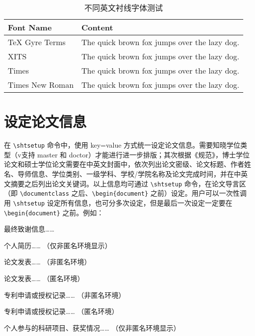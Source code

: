 \documentclass[
  fontset = mac,
]{shtthesis}
\providecommand{\timesnewroman}{\rmfamily}
\providecommand{\timesfamily}{\rmfamily}
\providecommand{\xitsfamily}{\rmfamily}
\begin{document}
\begin{table}[htb]
  \centering
  \caption{不同英文衬线字体测试}
  \label{tab::serif_fonts}
  \begin{tabular}{ll}
    \toprule
    Font Name & Content \\
    \midrule
    TeX Gyre Terms & {\rmfamily The quick brown fox jumps over the lazy dog.} \\
    XITS & {\xitsfamily The quick brown fox jumps over the lazy dog.} \\
    Times & {\timesfamily The quick brown fox jumps over the lazy dog.} \\
    Times New Roman & {\timesnewroman The quick brown fox jumps over the lazy dog.} \\
    \bottomrule
  \end{tabular}
\end{table}

\section{设定论文信息}
\shtthesis 在 \verb|\shtsetup| 命令中，使用 key=value 方式统一设定论文信息。\shtthesis 需要知晓学位类型（v\version 支持 master 和 doctor）才能进行进一步排版；其次根据《规范》，博士学位论文和硕士学位论文需要在中英文封面中，依次列出论文密级、论文标题、作者姓名、导师信息、学位类别、一级学科、学校/学院名称及论文完成时间，并在中英文摘要之后列出论文关键词。以上信息均可通过 \verb|\shtsetup| 命令，在论文导言区（即 \verb|\documentclass| 之后、\verb|\begin{document}| 之前）设定。用户可以一次性调用 \verb|\shtsetup| 设定所有信息，也可分多次设定，但是最后一次设定一定要在 \verb|\begin{document}| 之前。例如：
\begin{latex}
\end{latex}

\makebiblio

\appendix

\backmatter
\begin{acknowledgement}
  最终致谢信息……
\end{acknowledgement}

\begin{resume}
  个人简历…… （仅非匿名环境显示）
\end{resume}

\begin{publications}
  论文发表…… （非匿名环境）
\end{publications}

\begin{publications*}
  论文发表…… （匿名环境）
\end{publications*}

\begin{patterns}
  专利申请或授权记录…… （非匿名环境）
\end{patterns}

\begin{patterns*}
  专利申请或授权记录…… （匿名环境）
\end{patterns*}

\begin{projects}
  个人参与的科研项目、获奖情况…… （仅非匿名环境显示）
\end{projects}
\end{document}
